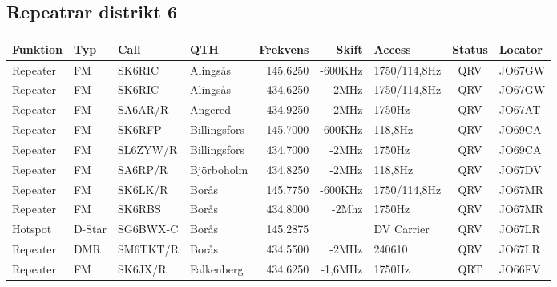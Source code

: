 \begin{landscape}
\subsection{Repeatrar distrikt 6}
\footnotesize
\begin{longtable}{llllrrlcl}
	\textbf{Funktion} & \textbf{Typ} & \textbf{Call} & \textbf{QTH}        & \textbf{Frekvens} & \textbf{Skift} & \textbf{Access} & \textbf{Status} & \textbf{Locator} \\ \hline
	\endhead
	Repeater          & FM           & SK6RIC        & Alingsås            &          145.6250 &        -600KHz & 1750/114,8Hz    &       QRV       & JO67GW           \\
	Repeater          & FM           & SK6RIC        & Alingsås            &          434.6250 &          -2MHz & 1750/114,8Hz    &       QRV       & JO67GW           \\
	Repeater          & FM           & SA6AR/R       & Angered             &          434.9250 &          -2MHz & 1750Hz          &       QRV       & JO67AT           \\
	Repeater          & FM           & SK6RFP        & Billingsfors        &          145.7000 &        -600KHz & 118,8Hz         &       QRV       & JO69CA           \\
	Repeater          & FM           & SL6ZYW/R      & Billingsfors        &          434.7000 &          -2MHz & 1750Hz          &       QRV       & JO69CA           \\
	Repeater          & FM           & SA6RP/R       & Björboholm          &          434.8250 &          -2MHz & 118,8Hz         &       QRV       & JO67DV           \\
	Repeater          & FM           & SK6LK/R       & Borås               &          145.7750 &        -600KHz & 1750/114,8Hz    &       QRV       & JO67MR           \\
	Repeater          & FM           & SK6RBS        & Borås               &          434.8000 &          -2Mhz & 1750Hz          &       QRV       & JO67MR           \\
	Hotspot           & D-Star       & SG6BWX-C      & Borås               &          145.2875 &                & DV Carrier      &       QRV       & JO67LR           \\
	Repeater          & DMR          & SM6TKT/R      & Borås               &          434.5500 &          -2MHz & 240610          &       QRV       & JO67LR           \\
	Repeater          & FM           & SK6JX/R       & Falkenberg          &          434.6250 &        -1,6MHz & 1750Hz          &       QRT       & JO66FV           \\

\end{longtable}
\end{landscape}

